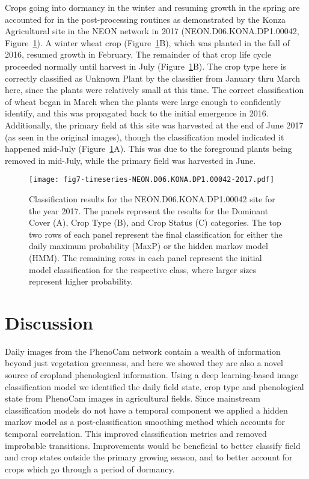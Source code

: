 \documentclass[remotesensing,article,submit,moreauthors,pdftex]{Definitions/mdpi}
\begin{document}
Crops going into dormancy in the winter and resuming growth in the spring are accounted for in the post-processing routines as demonstrated by the Konza Agricultural site in the NEON network in 2017 (NEON.D06.KONA.DP1.00042, Figure~\ref{fig7}). A winter wheat crop (Figure~\ref{fig7}B), which was planted in the fall of 2016, resumed growth in February. The remainder of that crop life cycle proceeded normally until harvest in July (Figure~\ref{fig7}B). The crop type here is correctly classified as Unknown Plant by the classifier from January thru March here, since the plants were relatively small at this time. The correct classification of wheat began in March when the plants were large enough to confidently identify, and this was propagated back to the initial emergence in 2016. Additionally, the primary field at this site was harvested at the end of June 2017 (as seen in the original images), though the classification model indicated it happened mid-July (Figure~\ref{fig7}A). This was due to the foreground plants being removed in mid-July, while the primary field was harvested in June. 

\begin{figure}[H]
    \centering
    \texttt{[image: fig7-timeseries-NEON.D06.KONA.DP1.00042-2017.pdf]}
    \caption{Classification results for the NEON.D06.KONA.DP1.00042 site for the year 2017. The panels represent the results for the Dominant Cover (A), Crop Type (B), and Crop Status (C) categories. The top two rows of each panel represent the final classification for either the daily maximum probability (MaxP) or the hidden markov model (HMM). The remaining rows in each panel represent the initial model classification for the respective class, where larger sizes represent higher probability.}
    \label{fig7}
\end{figure}

\section{Discussion}

Daily images from the PhenoCam network contain a wealth of information beyond just vegetation greenness, and here we showed they are also a novel source of cropland phenological information. Using a deep learning-based image classification model we identified the daily field state, crop type and phenological state from PhenoCam images in agricultural fields. Since mainstream classification models do not have a temporal component we applied a hidden markov model as a post-classification smoothing method which accounts for temporal correlation. This improved classification metrics and removed improbable transitions. Improvements would be beneficial to better classify field and crop states outside the primary growing season, and to better account for crops which go through a period of dormancy. 
\end{document}
